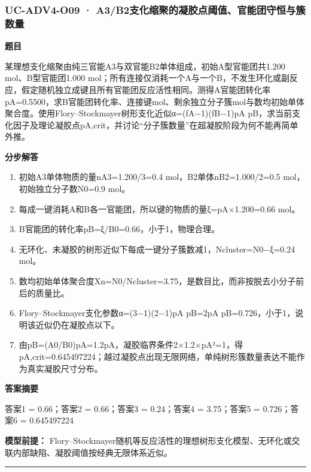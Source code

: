 \documentclass[UTF8,11pt,a4paper]{ctexart}
\begin{document}
\subsubsection*{UC-ADV4-O09 · A3/B2支化缩聚的凝胶点阈值、官能团守恒与簇数量}
\noindent\textbf{题目}\par
某理想支化缩聚由纯三官能A3与双官能B2单体组成，初始A型官能团共1.200 mol、B型官能团1.000 mol；所有连接仅消耗一个A与一个B，不发生环化或副反应，假定随机独立成键且所有官能团反应活性相同。测得A官能团转化率pA=0.5500，求B官能团转化率、连接键mol、剩余独立分子簇mol与数均初始单体聚合度。使用Flory–Stockmayer树形支化近似α=(fA−1)(fB−1)pA pB，求当前支化因子及理论凝胶点pA,crit，并讨论“分子簇数量”在超凝胶阶段为何不能再简单外推。\par
\medskip\noindent\textbf{分步解答}
\begin{enumerate}
\item 初始A3单体物质的量nA3=1.200/3=0.4 mol，B2单体nB2=1.000/2=0.5 mol，初始独立分子数N0=0.9 mol。
\item 每成一键消耗A和B各一官能团，所以键的物质的量ξ=pA×1.200=0.66 mol。
\item B官能团的转化率pB=ξ/B0=0.66，小于1，物理合理。
\item 无环化、未凝胶的树形近似下每成一键分子簇数减1，Ncluster=N0−ξ=0.24 mol。
\item 数均初始单体聚合度Xn=N0/Ncluster=3.75，是数目比，而非按脱去小分子前后的质量比。
\item Flory–Stockmayer支化参数α=(3−1)(2−1)pA pB=2pA pB=0.726，小于1，说明该近似仍在凝胶点以下。
\item 由pB=(A0/B0)pA=1.2pA，凝胶临界条件2×1.2×pA²=1，得pA,crit=0.645497224；越过凝胶点出现无限网络，单纯树形簇数量表达不能作为真实凝胶尺寸分布。
\end{enumerate}
\noindent\textbf{答案摘要}\par
答案1 = 0.66；答案2 = 0.66；答案3 = 0.24；答案4 = 3.75；答案5 = 0.726；答案6 = 0.645497224\par
\noindent\textbf{模型前提：}
Flory–Stockmayer随机等反应活性的理想树形支化模型、无环化或交联内部缺陷、凝胶阈值按经典无限体系近似。\par
\medskip\hrule\medskip
{}
\end{document}
